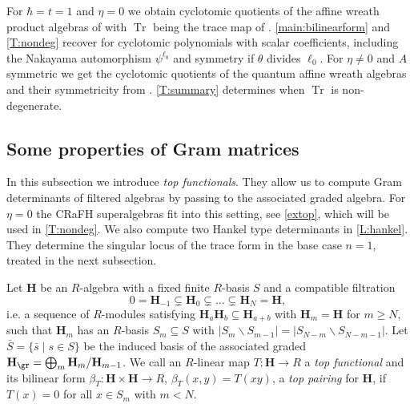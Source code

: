 \documentclass[a4paper,11pt]{amsart}
\newcommand{\Tr}{\op{Tr}}
\numberwithin{equation}{subsection}
\theoremstyle{definition}
\theoremstyle{theorem}
\theoremstyle{remark}
\newcommand\op{\operatorname}
\begin{document}
\begin{Remark}\label{R:SavageRS}
For $\hbar=t=1$ and $\eta=0$ we obtain cyclotomic quotients of the affine wreath product algebras of \cite{Savage:AffineWreath} with $\Tr$  being the trace map of \cite[(6.8)]{Savage:AffineWreath}. \autoref{main:bilinearform} and \autoref{T:nondeg} recover \cite[Theorem~6.15]{Savage:AffineWreath} for cyclotomic polynomials with scalar coefficients, including the Nakayama automorphism $\psi^{\ell_0}$ and symmetry if $\theta$ divides $\ell_0$. For $\eta\neq0$ and $A$ symmetric we get the cyclotomic quotients of the quantum affine wreath algebras and their symmetricity from \cite[Theorem~4.16]{RossoSavage:QuantumAffineWreath}. \autoref{T:summary} determines when $\Tr$ is non-degenerate.
\end{Remark}

\subsection{Some properties of Gram matrices}\label{sectop}
In this subsection we introduce \emph{top functionals}. They allow us to compute Gram determinants of filtered algebras by passing to the associated graded algebra. For $\eta=0$ the CRaFH superalgebras fit into this setting, see \autoref{extop}, which will be used in \autoref{T:nondeg}. We also compute two Hankel type determinants in \autoref{L:hankel}. They determine the singular locus of the trace form in the base case $n=1$, treated in the next subsection.

Let $\mathbf{H}$ be an $R$-algebra with a fixed finite $R$-basis $S$ and a compatible filtration
\begin{equation}\label{filttop}
  0=\mathbf{H}_{-1}\subsetneq \mathbf{H}_0\subsetneq\dots\subsetneq \mathbf{H}_N=\mathbf{H},
\end{equation}
 i.e. a sequence of $R$-modules satisfying $\mathbf{H}_a\mathbf{H}_b\subseteq \mathbf{H}_{a+b}$ with $\mathbf{H}_m=\mathbf{H}$ for $m\geq N$, such that $\mathbf{H}_m$ has an $R$-basis  $S_m\subseteq S$ with  $|S_m\smallsetminus S_{m-1}|=|S_{N-m}\smallsetminus S_{N-m-1}|$.
Let $\bar S=\{\bar s\mid s\in S\}$ be the induced basis of the associated graded $ \mathbf{H}_{\gr}=\bigoplus_m \mathbf{H}_m/\mathbf{H}_{m-1}$. We call an $R$-linear map $T \colon \mathbf{H}\rightarrow R$ a \emph{top functional} and its bilinear form $\beta_T\colon \mathbf{H}\times \mathbf{H}\to R$, $\beta_T(x,y)=T(xy)$, a \emph{top pairing} for  $\mathbf{H}$, if $T(x)=0$ for all $x\in S_m$ with $m<N$.
\end{document}
